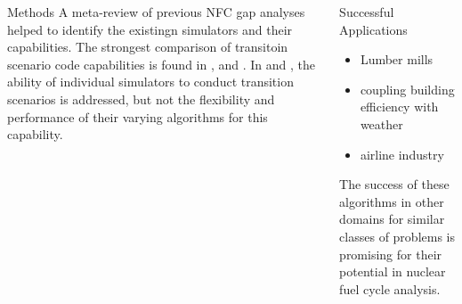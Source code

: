 \documentclass[final]{beamer}
\newlength{\onecolwid}
\newlength{\twocolwid}
\begin{document}
\begin{frame}[t]
\begin{columns}[t]
\begin{column}{\twocolwid}
\begin{columns}[t,totalwidth=\twocolwid] %

\begin{column}{\onecolwid}\vspace{-.6in} %


\begin{block}{Methods}
	A meta-review of previous \gls{NFC} gap analyses helped to identify the existingn
	simulators and their capabilities. The strongest comparison of transitoin scenario
	code capabilities is found in \cite{boucher_international_2010}, \cite{brown_identification_2016} and \cite{mccarthy_benchmark_2012}.
	In \cite{carre_overview_2009} and \cite{hoffman_expanded_2016}, the ability of
	individual simulators to conduct transition scenarios is addressed, but not the
	flexibility and performance of their varying algorithms for this capability.
	

\end{block}


\end{column} %

\begin{column}{\onecolwid}\vspace{-.6in} %


\begin{block}{Successful Applications}
{\large 	\begin{itemize}
		\item Lumber mills \cite{yanex_agent-based_2009}
		\item coupling building efficiency with weather \cite{gonzalez_detailed_2002, kusiak_data-driven_2010}
		\item airline industry \cite{shebalov_practical_2009}
	\end{itemize}
	}
The success of these algorithms in other domains for similar classes 
of problems is promising for their potential in nuclear fuel cycle analysis.


\end{block}
\end{column}
\end{columns}
\end{column}
\end{columns}
\end{frame}
\end{document}
